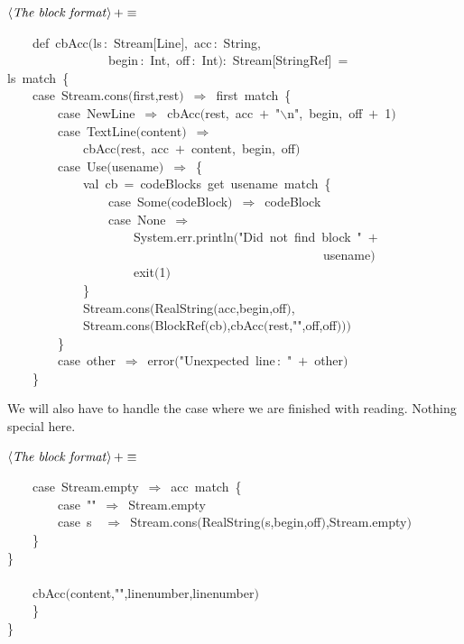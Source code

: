 \documentclass[a4paper,12pt]{article}
\begin{document}
$\left<\mbox{\emph{The block format}}\right>+\equiv$
\begin{program}~~~~{\vem def}~cbAcc$($ls\,{\rm :}~Stream$[$Line$]$,~acc\,{\rm :}~String,
\\~~~~~~~~~~~~~~~~begin\,{\rm :}~Int,~off\,{\rm :}~Int$)${\rm :}~Stream$[$StringRef$]$~=
\\ls~{\vem match}~{\small\{}
\\~~~~{\vem case}~Stream.cons$($first,rest$)$~$\Rightarrow$~first~{\vem match}~{\small\{}
\\~~~~~~~~{\vem case}~NewLine~$\Rightarrow$~cbAcc$($rest,~acc~$+$~"$\backslash$n",~begin,~off~$+$~1$)$
\\~~~~~~~~{\vem case}~TextLine$($content$)$~$\Rightarrow$
\\~~~~~~~~~~~~cbAcc$($rest,~acc~$+$~content,~begin,~off$)$
\\~~~~~~~~{\vem case}~Use$($usename$)$~$\Rightarrow$~{\small\{}
\\~~~~~~~~~~~~{\vem val}~cb~=~codeBlocks~get~usename~{\vem match}~{\small\{}
\\~~~~~~~~~~~~~~~~{\vem case}~Some$($codeBlock$)$~$\Rightarrow$~codeBlock
\\~~~~~~~~~~~~~~~~{\vem case}~None~$\Rightarrow$
\\~~~~~~~~~~~~~~~~~~~~System.err.println$($"Did~not~find~block~"~$+$
\\~~~~~~~~~~~~~~~~~~~~~~~~~~~~~~~~~~~~~~~~~~~~~~~~~~usename$)$
\\~~~~~~~~~~~~~~~~~~~~exit$($1$)$
\\~~~~~~~~~~~~{\small\}}
\\~~~~~~~~~~~~Stream.cons$($RealString$($acc,begin,off$)$,
\\~~~~~~~~~~~~Stream.cons$($BlockRef$($cb$)$,cbAcc$($rest,"",off,off$)$$)$$)$
\\~~~~~~~~{\small\}}
\\~~~~~~~~{\vem case}~other~$\Rightarrow$~error$($"Unexpected~line\,{\rm :}~"~$+$~other$)$
\\~~~~{\small\}}
\\[0.5em]\end{program}
We will also have to handle the case where we are finished with reading.
Nothing special here.

$\left<\mbox{\emph{The block format}}\right>+\equiv$
\begin{program}~~~~{\vem case}~Stream.empty~$\Rightarrow$~acc~{\vem match}~{\small\{}
\\~~~~~~~~{\vem case}~""~$\Rightarrow$~Stream.empty
\\~~~~~~~~{\vem case}~s~~$\Rightarrow$~Stream.cons$($RealString$($s,begin,off$)$,Stream.empty$)$
\\~~~~{\small\}}
\\{\small\}}
\\~~~~~~~~~~~~
\\~~~~cbAcc$($content,"",linenumber,linenumber$)$
\\~~~~{\small\}}
\\{\small\}}
\\[0.5em]\end{program}
\end{document}
